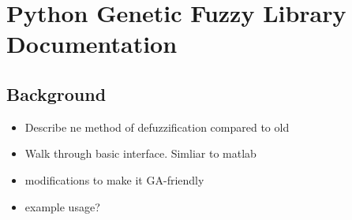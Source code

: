 \chapter{Python Genetic Fuzzy Library Documentation}
\section{Background}
\begin{itemize}
    \item Describe ne method of defuzzification compared to old
    \item Walk through basic interface. Simliar to matlab
    \item modifications to make it GA-friendly
    \item example usage?
\end{itemize}
